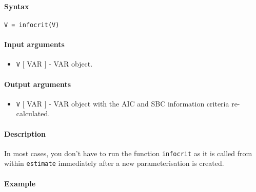


	\paragraph{Syntax}\label{syntax}

\begin{verbatim}
V = infocrit(V)
\end{verbatim}

\paragraph{Input arguments}\label{input-arguments}

\begin{itemize}
\itemsep1pt\parskip0pt
\item
  \texttt{V} {[} VAR {]} - VAR object.
\end{itemize}

\paragraph{Output arguments}\label{output-arguments}

\begin{itemize}
\itemsep1pt\parskip0pt
\item
  \texttt{V} {[} VAR {]} - VAR object with the AIC and SBC information
  criteria re-calculated.
\end{itemize}

\paragraph{Description}\label{description}

In most cases, you don't have to run the function \texttt{infocrit} as
it is called from within \texttt{estimate} immediately after a new
parameterisation is created.

\paragraph{Example}\label{example}


